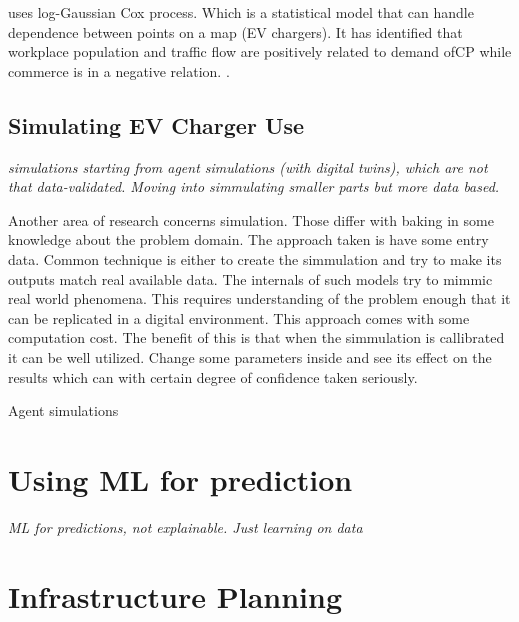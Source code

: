  uses log-Gaussian Cox process. Which is a statistical model that can handle dependence between points on a map (EV chargers). It has identified that workplace population and traffic flow are positively related to demand of\acrfull{CP} while commerce is in a negative relation. .


\subsection{Simulating EV Charger Use}

\textit{simulations
    starting from agent simulations (with digital twins), which are not that data-validated. Moving into simmulating smaller parts but more data based.
}

Another area of research concerns simulation. Those differ with baking in some knowledge about the problem domain.
The approach taken is have some entry data.
Common technique is either to create the simmulation and try to make its outputs match real available data. The internals of such models try to mimmic real world phenomena. This requires understanding of the problem enough that it can be replicated in a digital environment. This approach comes with some computation cost. The benefit of this is that when the simmulation is callibrated it can be well utilized. Change some parameters inside and see its effect on the results which can with certain degree of confidence taken seriously.

Agent simulations


\section{Using ML for prediction}

\textit{ML for predictions, not explainable. Just learning on data}

\section{Infrastructure Planning}

